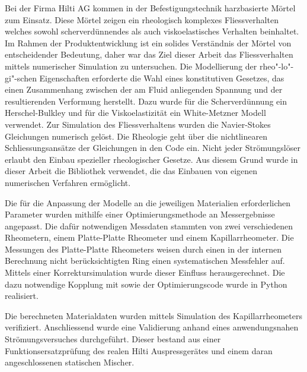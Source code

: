 \thispagestyle{empty}
\begin{abstr}
Bei der Firma Hilti AG kommen in der Befestigungstechnik harzbasierte Mörtel zum Einsatz.
Diese Mörtel zeigen ein rheologisch komplexes Fliessverhalten welches sowohl scherverdünnendes als auch viskoelastisches Verhalten beinhaltet. Im Rahmen der Produktentwicklung ist ein solides Verständnis der Mörtel von entscheidender Bedeutung, daher war das Ziel dieser Arbeit das Fliessverhalten mittels numerischer Simulation zu untersuchen.
Die Modellierung der rheo"-lo"-gi"-schen Eigenschaften erforderte die Wahl eines konstitutiven Gesetzes, das einen Zusammenhang zwischen der am Fluid anliegenden Spannung und der resultierenden Verformung herstellt. Dazu wurde für die Scherverdünnung ein Herschel-Bulkley und für die Viskoelastizität ein White-Metzner Modell verwendet.
Zur Simulation des Fliessverhaltens wurden die Navier-Stokes Gleichungen numerisch gelöst. Die Rheologie geht über die nichtlinearen Schliessungsansätze der Gleichungen in den Code ein. Nicht jeder Strömungslöser erlaubt den Einbau spezieller rheologischer Gesetze.
Aus diesem Grund wurde in dieser Arbeit die Bibliothek \openfoam{} verwendet, die das Einbauen von eigenen numerischen Verfahren ermöglicht.

Die für die Anpassung der Modelle an die jeweiligen Materialien erforderlichen Parameter wurden mithilfe einer Optimierungsmethode an Messergebnisse angepasst. Die dafür notwendigen Messdaten stammten von zwei verschiedenen Rheometern, einem Platte-Platte Rheometer und einem Kapillarrheometer. Die Messungen des Platte-Platte Rheometers weisen durch einen in der internen Berechnung nicht berücksichtigten Ring einen systematischen Messfehler auf. Mittels einer Korrektursimulation wurde dieser Einfluss herausgerechnet. Die dazu notwendige Kopplung mit \openfoam{} sowie der Optimierungscode wurde in Python realisiert.

Die berechneten Materialdaten wurden mittels Simulation des Kapillarrheometers verifiziert. Anschliessend wurde eine Validierung anhand eines anwendungsnahen Strömungsversuches durchgeführt. Dieser bestand aus einer Funktionsersatzprüfung des realen Hilti Auspressgerätes und einem daran angeschlossenen statischen Mischer.
\end{abstr}
%
\newpage
{}
%
